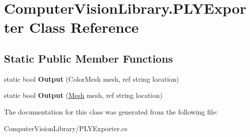 \hypertarget{class_computer_vision_library_1_1_p_l_y_exporter}{}\section{Computer\+Vision\+Library.\+P\+L\+Y\+Exporter Class Reference}
\label{class_computer_vision_library_1_1_p_l_y_exporter}
\subsection*{Static Public Member Functions}
\begin{DoxyCompactItemize}
\item 
\hypertarget{class_computer_vision_library_1_1_p_l_y_exporter_a061c4bc25d99cd1fe5eb47398ef05eec}{}\label{class_computer_vision_library_1_1_p_l_y_exporter_a061c4bc25d99cd1fe5eb47398ef05eec} 
static bool {\bfseries Output} (Color\+Mesh mesh, ref string location)
\item 
\hypertarget{class_computer_vision_library_1_1_p_l_y_exporter_aa43bff677fa9b8374fa48dd69a7c7da6}{}\label{class_computer_vision_library_1_1_p_l_y_exporter_aa43bff677fa9b8374fa48dd69a7c7da6} 
static bool {\bfseries Output} (\hyperlink{class_computer_vision_library_1_1_mesh}{Mesh} mesh, ref string location)
\end{DoxyCompactItemize}


The documentation for this class was generated from the following file\+:\begin{DoxyCompactItemize}
\item 
Computer\+Vision\+Library/P\+L\+Y\+Exporter.\+cs\end{DoxyCompactItemize}
